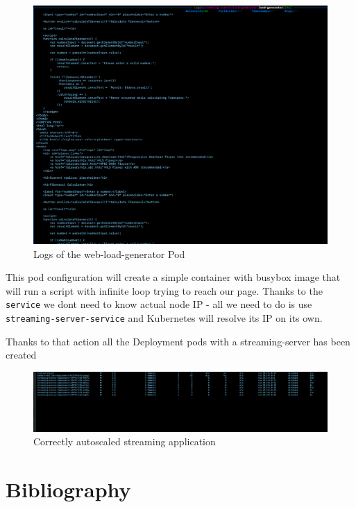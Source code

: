 \documentclass{article}
\begin{document}
\begin{figure}[H]
  \centering
  \includegraphics[width=\textwidth]{images/8_logs_of_web_load_generator.png}
  \caption{Logs of the web-load-generator Pod}
  \end{figure}

This pod configuration will create a simple container with busybox image
that will run a script with infinite loop trying to reach our page.
Thanks to the \texttt{service} we dont need to know actual node IP - all
we need to do is use \texttt{streaming-server-service} and Kubernetes
will resolve its IP on its own.

Thanks to that action all the Deployment pods with a streaming-server has been created
\begin{figure}[H]
  \centering
  \includegraphics[width=\textwidth]{images/9_multiple_deployments.png}
  \caption{Correctly autoscaled streaming application}
  \end{figure}

\section*{Bibliography}
\end{document}
